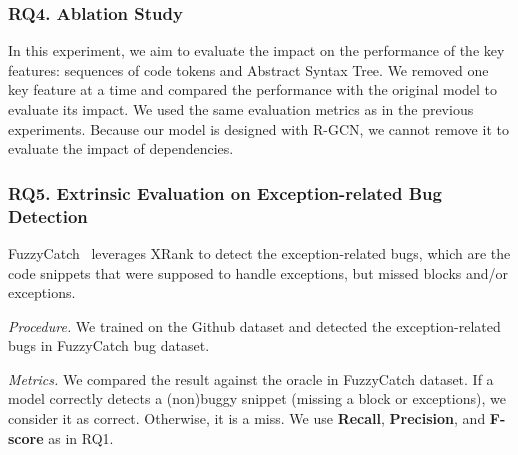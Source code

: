 \subsubsection{RQ4. Ablation Study}

In this experiment, we aim to evaluate the impact on the performance
of the key features: sequences of code tokens and Abstract Syntax Tree.
We removed one key feature at a time and compared the performance with
the original model to evaluate its impact. We used the same evaluation
metrics as in the previous experiments. Because our model is designed
with R-GCN, we cannot remove it to evaluate the impact of dependencies.


\subsubsection{RQ5. Extrinsic Evaluation on Exception-related Bug Detection\\}


 FuzzyCatch~\cite{xrank-fse20} leverages XRank
to detect the exception-related bugs, which are the code snippets that
were supposed to handle exceptions, but missed
 blocks and/or exceptions.

{\em Procedure.} We trained {\tool} on the Github dataset and detected
the exception-related bugs in FuzzyCatch bug dataset.


{\em Metrics.} We compared the result against the oracle in FuzzyCatch
dataset. If a model correctly detects a (non)buggy snippet (missing a
 block or exceptions), we consider it as correct.
Otherwise, it is a miss. We use {\bf Recall}, {\bf Precision}, and
{\bf F-score} as in RQ1.
